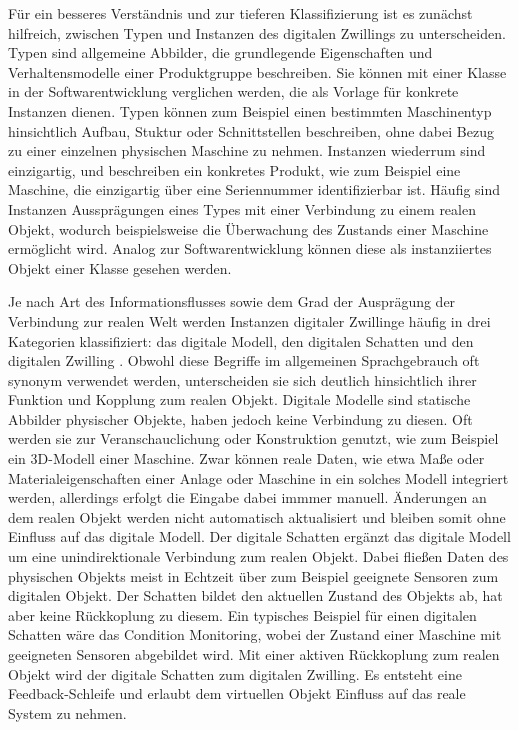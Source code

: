 Für ein besseres Verständnis und zur tieferen Klassifizierung ist es zunächst hilfreich, zwischen Typen und Instanzen des digitalen Zwillings zu unterscheiden.
Typen sind allgemeine Abbilder, die grundlegende Eigenschaften und Verhaltensmodelle einer Produktgruppe beschreiben. 
Sie können mit einer Klasse in der Softwarentwicklung verglichen werden, die als Vorlage für konkrete Instanzen dienen.
Typen können zum Beispiel einen bestimmten Maschinentyp hinsichtlich Aufbau, Stuktur oder Schnittstellen beschreiben, ohne dabei Bezug zu einer einzelnen physischen Maschine zu nehmen.
Instanzen wiederrum sind einzigartig, und beschreiben ein konkretes Produkt, wie zum Beispiel eine Maschine, die einzigartig über eine Seriennummer identifizierbar ist.
Häufig sind Instanzen Aussprägungen eines Types mit einer Verbindung zu einem realen Objekt, wodurch beispielsweise die Überwachung des Zustands einer Maschine ermöglicht wird.
Analog zur Softwarentwicklung können diese als instanziiertes Objekt einer Klasse gesehen werden. \cite{ZEISS}

Je nach Art des Informationsflusses sowie dem Grad der Ausprägung der Verbindung zur realen Welt werden Instanzen digitaler Zwillinge häufig in drei Kategorien klassifiziert: das digitale Modell, den digitalen Schatten und den digitalen Zwilling \cite{ClassificationDT}.
Obwohl diese Begriffe im allgemeinen Sprachgebrauch oft synonym verwendet werden, unterscheiden sie sich deutlich hinsichtlich ihrer Funktion und Kopplung zum realen Objekt.
Digitale Modelle sind statische Abbilder physischer Objekte, haben jedoch keine Verbindung zu diesen. 
Oft werden sie zur Veranschauclichung oder Konstruktion genutzt, wie zum Beispiel ein 3D-Modell einer Maschine.
Zwar können reale Daten, wie etwa Maße oder Materialeigenschaften einer Anlage oder Maschine in ein solches Modell integriert werden, allerdings erfolgt die Eingabe dabei immmer manuell.
Änderungen an dem realen Objekt werden nicht automatisch aktualisiert und bleiben somit ohne Einfluss auf das digitale Modell.
Der digitale Schatten ergänzt das digitale Modell um eine unindirektionale Verbindung zum realen Objekt.
Dabei fließen Daten des physischen Objekts meist in Echtzeit über zum Beispiel geeignete Sensoren zum digitalen Objekt.
Der Schatten bildet den aktuellen Zustand des Objekts ab, hat aber keine Rückkoplung zu diesem.
Ein typisches Beispiel für einen digitalen Schatten wäre das Condition Monitoring, wobei der Zustand einer Maschine mit geeigneten Sensoren abgebildet wird.
Mit einer aktiven Rückkoplung zum realen Objekt wird der digitale Schatten zum digitalen Zwilling.
Es entsteht eine Feedback-Schleife und erlaubt dem virtuellen Objekt Einfluss auf das reale System zu nehmen.


